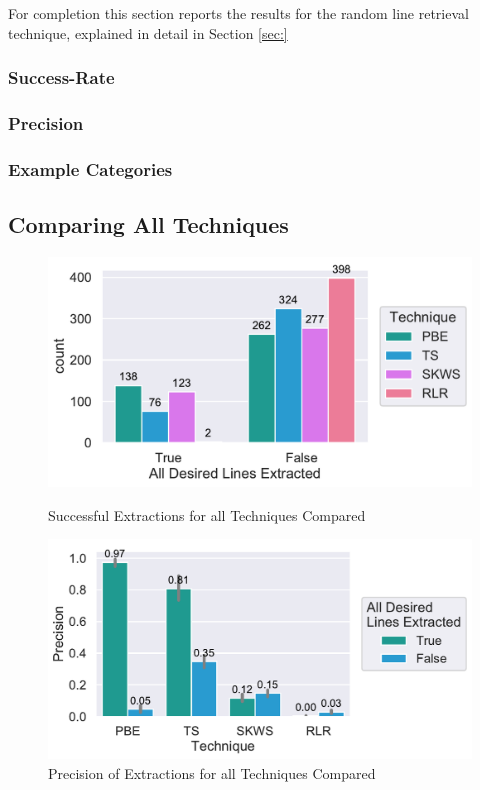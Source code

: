 \documentclass[\myrootdir/main.tex]{subfiles}
\begin{document}
For completion this section reports the results for the random line retrieval technique, explained in detail in Section \ref{sec:}

\subsubsection{Success-Rate}
\subsubsection{Precision}
\subsubsection{Example Categories}

\subsection{Comparing All Techniques}
\begin{figure}[htbp]
	\centering
	\begin{minipage}{0.45\textwidth}
		\centering
		\includegraphics[width=\textwidth, clip]{img/big-study/success-all.pdf}
		\caption{Successful Extractions for all Techniques Compared}
		\label{fig:success-all}
	\end{minipage}\hfill
	\begin{minipage}{0.45\textwidth}
		\centering
		\includegraphics[width=\textwidth, clip]{img/big-study/precision-all.pdf}
		\caption{Precision of Extractions for all Techniques Compared}
		\label{fig:precision-all}
	\end{minipage}
\end{figure}
\end{document}

